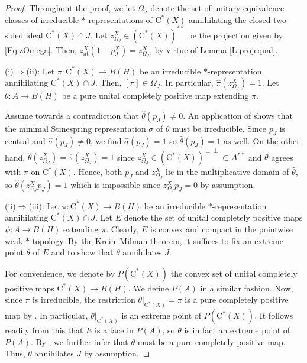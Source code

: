 \documentclass[10pt]{amsart}
\newcommand{\rC}{\mathrm{C}}
\newcommand{\at}{\operatorname{at}}
\theoremstyle{definition}
\begin{document}
\begin{proof}
Throughout the proof, we let $\Omega_J$ denote the set of unitary equivalence classes of irreducible $*$-representations of $\rC^*(X)$ annihilating the closed two-sided ideal $\rC^*(X)\cap J$. Let $z^X_{\Omega_J}\in ( \rC^*(X))^{**}$ be the projection given by \eqref{Eq:zOmega}. Then, $z^X_{\at}(1-p^X_J)=z^X_{\Omega_J}$, by virtue of Lemma \ref{L:projequal}.

(i)$\Rightarrow$(ii): Let $\pi:\rC^*(X)\to B(H)$ be an irreducible $*$-representation annihilating $\rC^*(X)\cap J$. Then,  $[\pi]\in \Omega_J$. In particular, $\widehat\pi(z^X_{\Omega_J})=1$.  Let $\theta:A\to B(H)$ be a pure unital completely positive map extending $\pi$.

Assume towards a contradiction that $\widehat\theta(p_J)\neq 0$. An application of \cite[Corollary 1.4.3]{arveson1969} shows that the minimal Stinespring representation $\sigma$ of $\theta$ must be irreducible. Since $p_J$ is central and $\widehat\sigma(p_J)\neq 0$, we find $\widehat\sigma(p_J)=1$ so $\widehat\theta(p_J)=1$ as well.
 On the other hand, $\widehat \theta(z^X_{\Omega_J})=\widehat \pi(z^X_{\Omega_J})=1$ since $z^X_{\Omega_J}\in (\rC^*(X))^{\perp\perp}\subset A^{**}$ and $\theta$ agrees with $\pi$ on $\rC^*(X)$. Hence, both $p_J$ and $z^X_{\Omega_J}$ lie in the multiplicative domain of $\widehat\theta$, so $\widehat\theta(z^X_{\Omega_J}p_J)=1$ which is impossible since $z^X_{\Omega_J}p_J=0$ by assumption.

(ii)$\Rightarrow$(iii):  Let $\pi:\rC^*(X)\to B(H)$ be an irreducible $*$-representation annihilating $\rC^*(X)\cap J$.  Let $E$ denote the set of unital completely positive maps $\psi:A \to B(H)$ extending $\pi$. Clearly, $E$ is convex and compact in the pointwise weak-$*$ topology. By the Krein--Milman theorem, it suffices to fix an extreme point $\theta$ of $E$ and to show that $\theta$ annihilates $J$. 

For convenience, we denote by $P(\rC^*(X))$ the convex set of unital completely positive maps $\rC^*(X)\to B(H)$. We define $P(A)$ in a similar fashion.  Now, since $\pi$ is irreducible, the restriction $\theta|_{\rC^*(X)}=\pi$ is a pure completely positive map by \cite[Corollary 1.4.3]{arveson1969}. In particular, $\theta|_{\rC^*(X)}$ is an extreme point of $P(\rC^*(X))$. It follows readily from this that $E$ is a face in $P(A)$, so $\theta$ is in fact an extreme point of $P(A)$. By \cite[Proposition 2.2]{kleski2014boundary}, we further infer that $\theta$ must be a pure completely positive map.  Thus, $\theta$ annihilates $J$ by assumption.



\end{proof}
\end{document}
